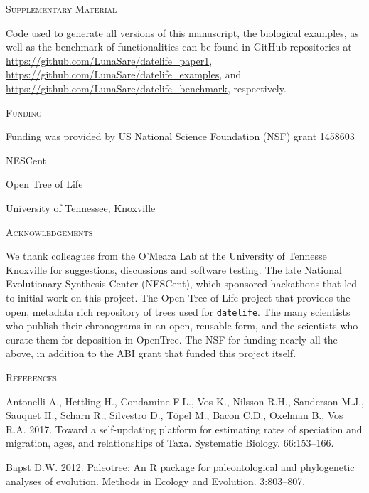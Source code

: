 \documentclass[]{article}
\begin{document}
\begin{center}
\textsc{Supplementary Material}
\end{center}

Code used to generate all versions of this manuscript, the biological examples, as well as the benchmark of functionalities can be found in GitHub repositories at \url{https://github.com/LunaSare/datelife_paper1}, \url{https://github.com/LunaSare/datelife_examples}, and \url{https://github.com/LunaSare/datelife_benchmark}, respectively.

\begin{center}
\textsc{Funding}
\end{center}

Funding was provided by US National Science Foundation (NSF) grant 1458603

NESCent

Open Tree of Life

University of Tennessee, Knoxville

\begin{center}
\textsc{Acknowledgements}
\end{center}

We thank colleagues from the O'Meara Lab at the University
of Tennesse Knoxville for suggestions, discussions and software testing.
The late National Evolutionary Synthesis Center (NESCent), which sponsored hackathons
that led to initial work on this project.
The Open Tree of Life project that provides the open, metadata rich repository of
trees used for \texttt{datelife}.
The many scientists who publish their chronograms in an open, reusable form, and
the scientists who curate them for deposition in OpenTree.
The NSF for funding nearly all the above, in addition
to the ABI grant that funded this project itself.

\newpage

\begin{center}
\textsc{References}
\end{center}

\hypertarget{refs}{}
\leavevmode\hypertarget{ref-antonelli2017supersmart}{}%
Antonelli A., Hettling H., Condamine F.L., Vos K., Nilsson R.H., Sanderson M.J., Sauquet H., Scharn R., Silvestro D., Töpel M., Bacon C.D., Oxelman B., Vos R.A. 2017. Toward a self-updating platform for estimating rates of speciation and migration, ages, and relationships of Taxa. Systematic Biology. 66:153--166.

\leavevmode\hypertarget{ref-Bapst2012a}{}%
Bapst D.W. 2012. Paleotree: An R package for paleontological and phylogenetic analyses of evolution. Methods in Ecology and Evolution. 3:803--807.
\end{document}
